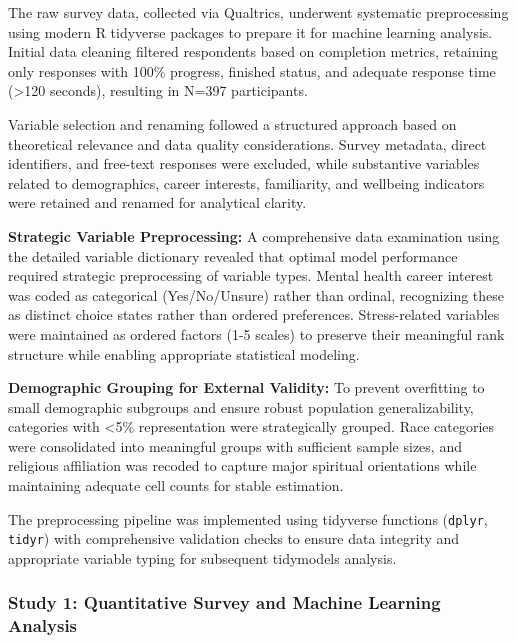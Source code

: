 \documentclass[
  man,
  longtable,
  nolmodern,
  notxfonts,
  notimes,
  colorlinks=true,linkcolor=blue,citecolor=blue,urlcolor=blue]{apa7}
\begin{document}
The raw survey data, collected via Qualtrics, underwent systematic
preprocessing using modern R tidyverse packages to prepare it for
machine learning analysis. Initial data cleaning filtered respondents
based on completion metrics, retaining only responses with 100\%
progress, finished status, and adequate response time (\textgreater120
seconds), resulting in N=397 participants.

Variable selection and renaming followed a structured approach based on
theoretical relevance and data quality considerations. Survey metadata,
direct identifiers, and free-text responses were excluded, while
substantive variables related to demographics, career interests,
familiarity, and wellbeing indicators were retained and renamed for
analytical clarity.

\textbf{Strategic Variable Preprocessing:} A comprehensive data
examination using the detailed variable dictionary revealed that optimal
model performance required strategic preprocessing of variable types.
Mental health career interest was coded as categorical (Yes/No/Unsure)
rather than ordinal, recognizing these as distinct choice states rather
than ordered preferences. Stress-related variables were maintained as
ordered factors (1-5 scales) to preserve their meaningful rank structure
while enabling appropriate statistical modeling.

\textbf{Demographic Grouping for External Validity:} To prevent
overfitting to small demographic subgroups and ensure robust population
generalizability, categories with \textless5\% representation were
strategically grouped. Race categories were consolidated into meaningful
groups with sufficient sample sizes, and religious affiliation was
recoded to capture major spiritual orientations while maintaining
adequate cell counts for stable estimation.

The preprocessing pipeline was implemented using tidyverse functions
(\texttt{dplyr}, \texttt{tidyr}) with comprehensive validation checks to
ensure data integrity and appropriate variable typing for subsequent
tidymodels analysis.

\subsubsection{Study 1: Quantitative Survey and Machine Learning
Analysis}\label{study-1-quantitative-survey-and-machine-learning-analysis}
\end{document}

